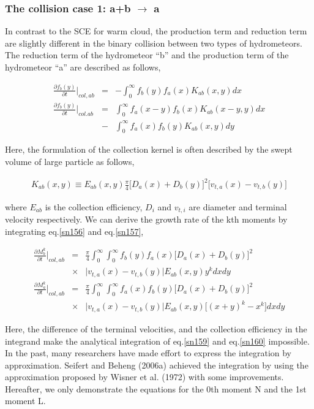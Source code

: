 \subsubsection{The collision case 1: a+b $\rightarrow$ a}
In contrast to the SCE for warm cloud, the production term and reduction term are slightly different in the binary collision between two types of hydrometeors. The reduction term of the hydrometeor “b” and the production term of the hydrometeor “a” are described as follows,

\begin{eqnarray}
\frac{\partial f_{b}(y)}{\partial t}\Bigr|_{col,ab}&=&-\int_{0}^{\infty}f_{b}(y)f_{a}(x)K_{ab}(x,y)dx\label{sn156}\\
\frac{\partial f_{b}(y)}{\partial t}\Bigr|_{col.ab}&=&\int_{0}^{\infty}f_{a}(x-y)f_{b}(x)K_{ab}(x-y,y)dx\nonumber\\
&-&\int_{0}^{\infty}f_{a}(x)f_{b}(y)K_{ab}(x,y)dy\label{sn157}
\end{eqnarray}

Here, the formulation of the collection kernel is often described by the swept volume of large particle as follows,

\begin{eqnarray}
K_{ab}(x,y)\equiv E_{ab}(x,y)\frac{\pi}{4}\bigl[D_{a}(x)+D_{b}(y)\bigr]^{2}\bigl[v_{t,a}(x)-v_{t,b}(y)\bigr]\label{sn158}
\end{eqnarray}

where $E_{ab}$ is the collection efficiency, $D_{i}$ and $v_{t,i}$ are diameter and terminal velocity respectively. We can derive the growth rate of the kth moments by integrating eq.\ref{sn156} and eq.\ref{sn157},

\begin{eqnarray}
\frac{\partial M_{b}^{k}}{\partial t}\Bigr|_{col,ab}&=&\frac{\pi}{4}\int_{0}^{\infty}\int_{0}^{\infty}f_{b}(y)f_{a}(x)\bigl[D_{a}(x)+D_{b}(y)\bigr]^{2}\nonumber\\
&\times&\bigl|v_{t,a}(x)-v_{t,b}(y)\bigr|E_{ab}(x,y)y^{k}dxdy\label{sn159}\\
\frac{\partial M_{a}^{k}}{\partial t}\Bigr|_{col,ab}&=&\frac{\pi}{4}\int_{0}^{\infty}\int_{0}^{\infty}f_{a}(x)f_{b}(y)\bigl[D_{a}(x)+D_{b}(y)\bigr]^{2}\nonumber\\
&\times&\bigl|v_{t,a}(x)-v_{t,b}(y)\bigr|E_{ab}(x,y)\bigl[(x+y)^{k}-x^{k}\bigr]dxdy\label{sn160}
\end{eqnarray}

Here, the difference of the terminal velocities, and the collection efficiency in the integrand make the analytical integration of eq.\ref{sn159} and eq.\ref{sn160} impossible. In the past, many researchers have made effort to express the integration by approximation. Seifert and Beheng (2006a) achieved the integration by using the approximation proposed by Wisner et al. (1972) with some improvements. Hereafter, we only demonstrate the equations for the 0th moment N and the 1st moment L.

